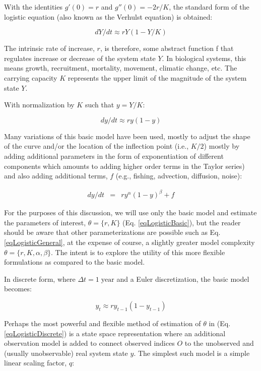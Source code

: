 \documentclass[letterpaper,portrait,11pt]{scrartcl}
\numberwithin{equation}{section}		%
\numberwithin{figure}{section}		%
\numberwithin{table}{section}				%
\begin{document}
With the identities $g'(0) = r$  and $g''(0) = - 2r/K$, the standard form of the logistic equation (also known as the Verhulst equation) is obtained:

\begin{equation} 
\label{eqLogistic}
dY/dt \approx r Y (1 - Y/K)
\end{equation}

The intrinsic rate of increase, $r$, is therefore, some abstract function f that regulates increase or decrease of the system state $Y$. In biological systems, this means growth, recruitment, mortality,  movement, climatic change, etc. The carrying capacity $K$ represents the upper limit of the magnitude of the system state $Y$.

With normalization by $K$ such that $ y = Y/K $:

\begin{equation} 
\label{eqLogisticBasic}
dy/dt  \approx  r y (1 - y)
\end{equation}

Many variations of this basic model have been used, mostly to adjust the shape of the curve and/or the location of the inflection point (i.e., $K/2$) mostly by adding additional parameters in the form of exponentiation of different components which amounts to adding higher order terms in the Taylor series) and also adding additional terms, $f$ (e.g., fishing, advection, diffusion, noise): 

\begin{eqnarray} 
\label{eqLogisticGeneral}
dy / dt &=& r y^{\alpha} ( 1 - y )^{\beta} + f 
\end{eqnarray}

For the purposes of this discussion, we will use only the basic model and estimate the parameters of interest, $\theta = \{r, K \}$ (Eq. \ref{eqLogisticBasic}), but the reader should be aware that other parameterizations are possible such as Eq. \ref{eqLogisticGeneral}, at the expense of course, a slightly greater model complexity $\theta=\{r,K,\alpha,\beta\}$. The intent is to explore the utility of this more flexible formulations as compared to the basic model. 

In discrete form, where $\Delta t = 1 \; \text{year}$ and a Euler discretization, the basic model becomes:

\begin{equation} 
\label{eqLogisticDiscrete}
y_t  \approx r y_{t-1} (1 - y_{t-1} )
\end{equation}

Perhaps the most powerful and flexible method of estimation of $\theta$ in (Eq. \ref{eqLogisticDiscrete}) is a state space representation where an additional observation model is added to connect observed indices $O$ to the unobserved and (usually unobservable) real system state $y$. The simplest such model is a simple linear scaling factor, $q$: 
\end{document}
